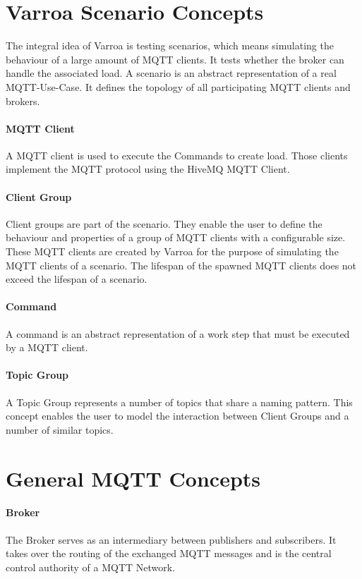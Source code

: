 
\section{Varroa Scenario Concepts}
The integral idea of Varroa is testing scenarios, which means simulating the behaviour of a large amount of MQTT clients.
It tests whether the broker can handle the associated load.
A scenario is an abstract representation of a real MQTT-Use-Case.
It defines the topology of all participating MQTT clients and brokers.

\paragraph{MQTT Client}
A MQTT client is used to execute the Commands to create load.
Those clients implement the MQTT protocol using the HiveMQ MQTT Client.

\paragraph{Client Group}
Client groups are part of the scenario.
They enable the user to define the behaviour and properties of a group of MQTT clients with a configurable size.
These MQTT clients are created by Varroa for the purpose of simulating the MQTT clients of a scenario.
The lifespan of the spawned MQTT clients does not exceed the lifespan of a scenario.

\paragraph{Command}
A command is an abstract representation of a work step that must be executed by a MQTT client.

\paragraph{Topic Group}
A Topic Group represents a number of topics that share a naming pattern.
This concept enables the user to model the interaction between Client Groups and a number of similar topics.

\section{General MQTT Concepts}
\paragraph{Broker}
The Broker serves as an intermediary between publishers and subscribers.
It takes over the routing of the exchanged MQTT messages and is the central control authority of a MQTT Network.
